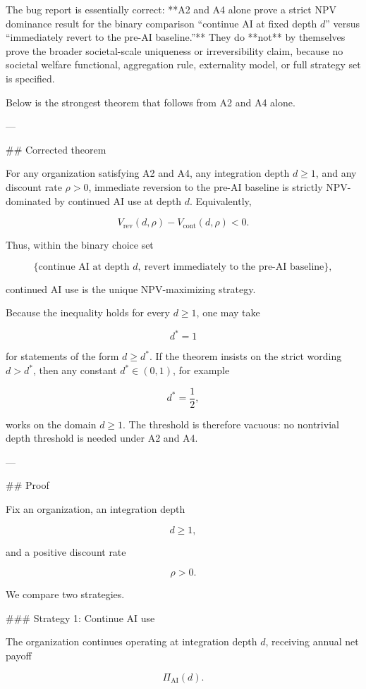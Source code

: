 The bug report is essentially correct: **A2 and A4 alone prove a strict NPV dominance result for the binary comparison “continue AI at fixed depth \(d\)” versus “immediately revert to the pre-AI baseline.”** They do **not** by themselves prove the broader societal-scale uniqueness or irreversibility claim, because no societal welfare functional, aggregation rule, externality model, or full strategy set is specified.

Below is the strongest theorem that follows from A2 and A4 alone.

---

## Corrected theorem

For any organization satisfying A2 and A4, any integration depth \(d \ge 1\), and any discount rate \(\rho>0\), immediate reversion to the pre-AI baseline is strictly NPV-dominated by continued AI use at depth \(d\). Equivalently,

\[
V_{\mathrm{rev}}(d,\rho)-V_{\mathrm{cont}}(d,\rho)<0.
\]

Thus, within the binary choice set

\[
\{\text{continue AI at depth }d,\ \text{revert immediately to the pre-AI baseline}\},
\]

continued AI use is the unique NPV-maximizing strategy.

Because the inequality holds for every \(d\ge 1\), one may take

\[
d^* = 1
\]

for statements of the form \(d\ge d^*\). If the theorem insists on the strict wording \(d>d^*\), then any constant \(d^*\in(0,1)\), for example

\[
d^*=\frac12,
\]

works on the domain \(d\ge 1\). The threshold is therefore vacuous: no nontrivial depth threshold is needed under A2 and A4.

---

## Proof

Fix an organization, an integration depth

\[
d\ge 1,
\]

and a positive discount rate

\[
\rho>0.
\]

We compare two strategies.

### Strategy 1: Continue AI use

The organization continues operating at integration depth \(d\), receiving annual net payoff

\[
\Pi_{\mathrm{AI}}(d).
\]

